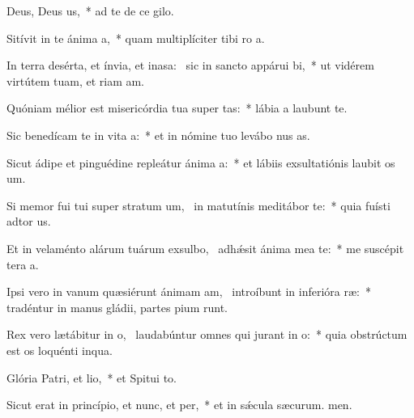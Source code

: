 \item Deus, Deus us,~* ad te de ce gilo.
\item Sitívit in te ánima a,~* quam multiplíciter tibi ro a.
\item In terra desérta, et ínvia, et inasa:~\pscross{} sic in sancto appárui bi,~* ut vidérem virtútem tuam, et riam am.
\item Quóniam mélior est misericórdia tua super tas:~* lábia a laubunt te.
\item Sic benedícam te in vita a:~* et in nómine tuo levábo nus as.
\item Sicut ádipe et pinguédine repleátur ánima a:~* et lábiis exsultatiónis laubit os um.
\item Si memor fui tui super stratum um,~\pscross{} in matutínis meditábor  te:~* quia fuísti adtor us.
\item Et in velaménto alárum tuárum exsulbo,~\pscross{} adhǽsit ánima mea  te:~* me suscépit tera a.
\item Ipsi vero in vanum quæsiérunt ánimam am,~\pscross{} introíbunt in inferióra ræ:~* tradéntur in manus gládii, partes pium runt.
\item Rex vero lætábitur in o,~\pscross{} laudabúntur omnes qui jurant in o:~* quia obstrúctum est os loquénti inqua.
\item Glória Patri, et lio,~* et Spitui to.
\item Sicut erat in princípio, et nunc, et per,~* et in sǽcula sæcurum. men.
